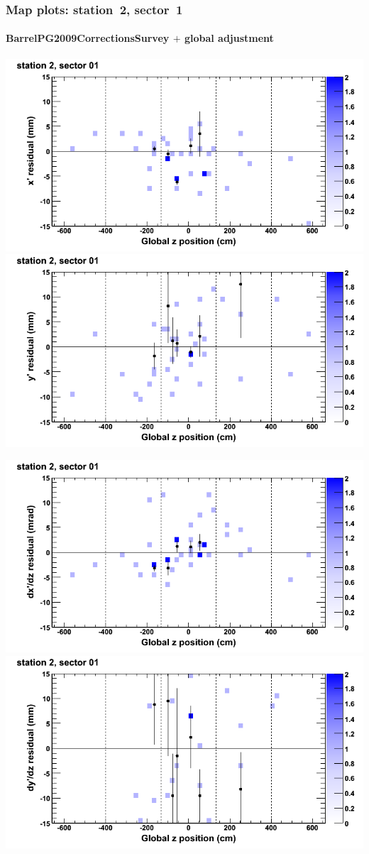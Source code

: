 \documentclass[compress]{beamer}
\begin{document}
\begin{frame}
\frametitle{Map plots: station~2, sector~1}
\framesubtitle{BarrelPG2009CorrectionsSurvey $+$ global adjustment}
\includegraphics[width=0.5\linewidth]{mapplots_re01/DTvsz_st2sec01_x.png}
\includegraphics[width=0.5\linewidth]{mapplots_re01/DTvsz_st2sec01_y.png}

\includegraphics[width=0.5\linewidth]{mapplots_re01/DTvsz_st2sec01_dxdz.png}
\includegraphics[width=0.5\linewidth]{mapplots_re01/DTvsz_st2sec01_dydz.png}
\end{frame}
\end{document}
